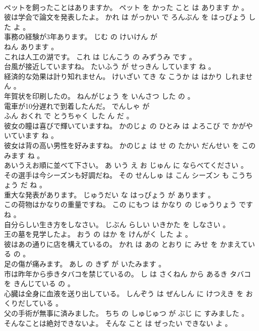 \documentclass[8pt]{extreport}
\begin{document}
\begin{CJK}{UTF8}{min}
\\	ペットを飼ったことはありますか。	ペット を かった こと は あります か 。 
\\	彼は学会で論文を発表したよ。	かれ は がっかい で ろんぶん を はっぴょう した よ 。 
\\	事務の経験が3年あります。	じむ の けいけん が 
\\	ねん あります 。 
\\	これは人工の湖です。	これ は じんこう の みずうみ です 。 
\\	台風が接近していますね。	たいふう が せっきん しています ね 。 
\\	経済的な効果は計り知れません。	けいざい てき な こうか は はかり しれません 。 
\\	年賀状を印刷したの。	ねんがじょう を いんさつ した の 。 
\\	電車が10分遅れで到着したんだ。	でんしゃ が 
\\	ふん おくれ で とうちゃく した ん だ 。 
\\	彼女の瞳は喜びで輝いていますね。	かのじょ の ひとみ は よろこび で かがやいています ね 。 
\\	彼女は背の高い男性を好みますね。	かのじょ は せ の たかい だんせい を このみます ね 。 
\\	あいうえお順に並べて下さい。	あ いう え お じゅん に ならべてください 。 
\\	その選手は今シーズンも好調だね。	その せんしゅ は こん シーズン も こうちょう だ ね 。 
\\	重大な発表があります。	じゅうだい な はっぴょう が あります 。 
\\	この荷物はかなりの重量ですね。	この にもつ は かなり の じゅうりょう です ね 。 
\\	自分らしい生き方をしなさい。	じぶん らしい いきかた を しなさい 。 
\\	王の墓を見学したよ。	おう の はか を けんがく した よ 。 
\\	彼はあの通りに店を構えているの。	かれ は あの とおり に みせ を かまえている の 。 
\\	足の傷が痛みます。	あし の きず が いたみます 。 
\\	市は昨年から歩きタバコを禁じているの。	し は さくねん から あるき タバコ を きんじている の 。 
\\	心臓は全身に血液を送り出している。	しんぞう は ぜんしん に けつえき を おくりだしている 。 
\\	父の手術が無事に済みました。	ちち の しゅじゅつ が ぶじ に すみました 。 
\\	そんなことは絶対できないよ。	そんな こと は ぜったい できない よ 。 

\end{CJK}
\end{document}
